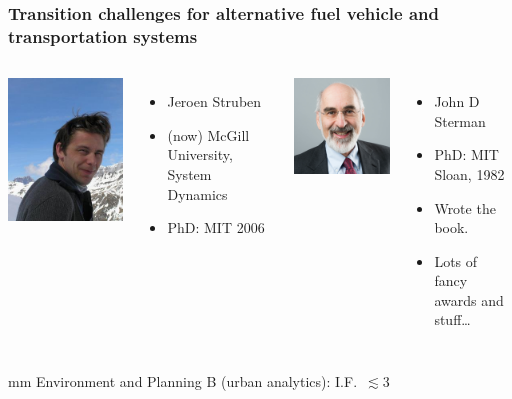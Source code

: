 \documentclass{beamer}
\begin{document}
\begin{frame}
  \frametitle{Transition challenges for alternative fuel vehicle and transportation systems}
  \begin{columns}
    \includegraphics[height=0.3\textheight]{JeroenStruben.jpeg}
    \begin{itemize}
    \item Jeroen Struben
    \item (now) McGill University, System Dynamics
    \item PhD: MIT 2006
    \end{itemize}
    \includegraphics[height=0.3\textheight]{Sterman.png}
    \begin{itemize}
    \item John D Sterman
    \item PhD: MIT Sloan, 1982
    \item Wrote the book.
    \item Lots of fancy awards and stuff\dots
    \end{itemize}
  \end{columns}
   mm
  Environment and Planning B (urban analytics): I.F.~$\lesssim 3$
\end{frame}
\end{document}
